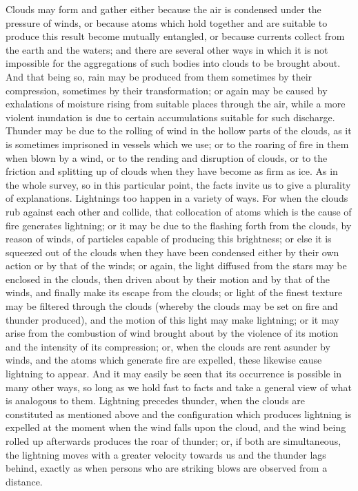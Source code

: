 \documentclass{stex}
\begin{document}
Clouds may form and gather either because the air is condensed under the pressure of winds, or because atoms which hold together and are suitable to produce this result become mutually entangled, or because currents collect from the earth and the waters; and there are several other ways in which it is not impossible for the aggregations of such bodies into clouds to be brought about.
And that being so, rain may be produced from them sometimes by their compression, sometimes by their transformation; or again may be caused by exhalations of moisture rising from suitable places through the air, while a more violent inundation is due to certain accumulations suitable for such discharge.
Thunder may be due to the rolling of wind in the hollow parts of the clouds, as it is sometimes imprisoned in vessels which we use; or to the roaring of fire in them when blown by a wind, or to the rending and disruption of clouds, or to the friction and splitting up of clouds when they have become as firm as ice.
As in the whole survey, so in this particular point, the facts invite us to give a plurality of explanations.
Lightnings too happen in a variety of ways.
For when the clouds rub against each other and collide, that collocation of atoms which is the cause of fire generates lightning; or it may be due to the flashing forth from the clouds, by reason of winds, of particles capable of producing this brightness; or else it is squeezed out of the clouds when they have been condensed either by their own action or by that of the winds; or again, the light diffused from the stars may be enclosed in the clouds, then driven about by their motion and by that of the winds, and finally make its escape from the clouds; or light of the finest texture may be filtered through the clouds (whereby the clouds may be set on fire and thunder produced), and the motion of this light may make lightning; or it may arise from the combustion of wind brought about by the violence of its motion and the intensity of its compression;
or, when the clouds are rent asunder by winds, and the atoms which generate fire are expelled, these likewise cause lightning to appear.
And it may easily be seen that its occurrence is possible in many other ways, so long as we hold fast to facts and take a general view of what is analogous to them.
Lightning precedes thunder, when the clouds are constituted as mentioned above and the configuration which produces lightning is expelled at the moment when the wind falls upon the cloud, and the wind being rolled up afterwards produces the roar of thunder; or, if both are simultaneous, the lightning moves with a greater velocity towards us and the thunder lags behind, exactly as when persons who are striking blows are observed from a distance.
\end{document}
